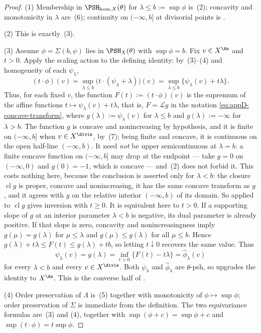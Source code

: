 \begin{proof}
(1)  Membership in $\PSH_{\mathrm{hom},X}(\theta)$ for
$\lambda\leq b:=\sup\phi$ is
\,(2); concavity and monotonicity in
$\lambda$ are \,(6); continuity on
$(-\infty,b]$ at divisorial points is
.

(2)  This is exactly
\,(3).

(3)  Assume $\phi=\Sigma(b,\psi)$ lies in
$\PSH_X(\theta)$ with $\sup\phi=b$.  Fix $v\in X^{\An}$ and
$t>0$.  Apply the scaling action to the defining identity: by
\,(3)--(4) and homogeneity of each
$\psi_\lambda$,
\[
 (t\cdot\phi)(v)
 =\sup_{\lambda\leq b}\bigl(t\cdot(\psi_\lambda+\lambda)\bigr)(v)
 =\sup_{\lambda\leq b}\{\psi_\lambda(v)+t\lambda\}.
\]
Thus, for each fixed $v$, the function
$F(t):=(t\cdot\phi)(v)$ is the supremum of the affine functions
$t\mapsto\psi_\lambda(v)+t\lambda$, that is, $F=\mathcal Lg$ in the
notation \eqref{eq:appD-concave-transform}, where
$g(\lambda):=\psi_\lambda(v)$ for $\lambda\leq b$ and
$g(\lambda):=-\infty$ for $\lambda>b$.  The function $g$ is concave
and nonincreasing by hypothesis, and it is finite on $(-\infty,b]$ when $v\in X^{\divis}$, by
\,(7); being finite and concave, it is
continuous on the open half-line $(-\infty,b)$.  It need \emph{not} be
upper semicontinuous at $\lambda=b$: a finite concave function on
$(-\infty,b]$ may drop at the endpoint --- take $g=0$ on
$(-\infty,0)$ and $g(0)=-1$, which is concave --- and
\,(2) does not forbid it.  This costs
nothing here, because the conclusion is asserted only for $\lambda<b$:
the closure $\operatorname{cl}g$ is proper, concave and nonincreasing,
it has the same concave transform as $g$, and it agrees with $g$ on
the relative interior $(-\infty,b)$ of its domain.  So
 applied to $\operatorname{cl}g$ gives
inversion with $t\geq0$. It is equivalent here to $t>0$. If a supporting
slope of $g$ at an interior parameter $\lambda<b$ is negative, its dual
parameter is already positive. If that slope is zero, concavity and
nonincreasingness imply $g(\mu)=g(\lambda)$ for $\mu\leq\lambda$
and $g(\mu)\leq g(\lambda)$ for all $\mu\leq b$. Hence
$g(\lambda)+t\lambda\leq F(t)\leq g(\lambda)+tb$, so letting
$t\downarrow0$ recovers the same value. Thus
\[
 \psi_\lambda(v)=g(\lambda)=\inf_{t>0}\{F(t)-t\lambda\}
 =\widehat\phi_\lambda(v)
\]
for every $\lambda<b$ and every $v\in X^{\divis}$.  Both
$\psi_\lambda$ and $\widehat\phi_\lambda$ are $\theta$-psh, so
 upgrades the identity to
$X^{\An}$.  This is the converse half of
\cite[Theorem~6.24]{BJ22}.

(4)  Order preservation of $\Lambda$ is
\,(5) together with monotonicity of
$\phi\mapsto\sup\phi$; order preservation of $\Sigma$ is immediate from
the definition.  The two equivariance formulas are
\,(3) and (4), together with
$\sup(\phi+c)=\sup\phi+c$ and
$\sup(t\cdot\phi)=t\sup\phi$.
\end{proof}

